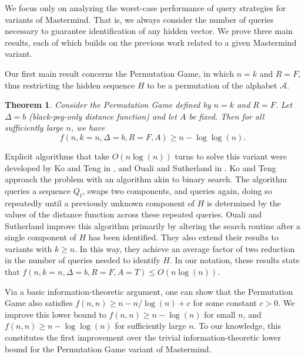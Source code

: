 \documentclass[12pt, a4paper]{article}
\newtheorem{theorem}{Theorem}
\begin{document}
We focus only on analyzing the worst-case performance of query strategies for variants of Mastermind. That is, we always consider the number of queries necessary to guarantee identification of any hidden vector. We prove three main results, each of which builds on the previous work related to a given Mastermind variant.


Our first main result concerns the Permutation Game, in which $n=k$ and $R=F$, thus restricting the hidden sequence $H$ to be a permutation of the alphabet $\mathcal{A}$.
\begin{theorem}\label{permutationGameTheorem}
	 Consider the Permutation Game defined by $n = k$ and $R = F$. Let $\Delta = b$ (black-peg-only distance function) and let $A$ be fixed. Then for all sufficiently large $n$, we have	
 	\begin{equation*}
		f(n, k = n, \Delta = b, R = F, A) \ge n - \log\log(n).
	\end{equation*}
\end{theorem}

Explicit algorithms that take $O(n \log(n))$ turns to solve this variant were developed by Ko and Teng in \cite{KT86}, and Ouali and Sutherland in \cite{OS13}. Ko and Teng approach the problem with an algorithm akin to binary search. The algorithm queries a sequence $Q_t$, swaps two components, and queries again, doing so repeatedly until a previously unknown component of $H$ is determined by the values of the distance function across these repeated queries. Ouali and Sutherland improve this algorithm primarily by altering the search routine after a single component of $H$ has been identified. They also extend their results to variants with $k\ge n$. In this way, they achieve an average factor of two reduction in the number of queries needed to identify $H$. In our notation, these results state that $f(n, k=n, \Delta=b, R = F, A = T)\le O(n\log(n))$.

Via a basic information-theoretic argument, one can show that the Permutation Game also satisfies $f(n, n)\ge n - n/\log(n) + c$ for some constant $c>0$. We improve this lower bound to $f(n, n)\ge n - \log(n)$ for small $n$, and $f(n, n)\ge n- \log \log(n)$ for sufficiently large $n$. To our knowledge, this constitutes the first improvement over the trivial information-theoretic lower bound for the Permutation Game variant of Mastermind.
\end{document}
